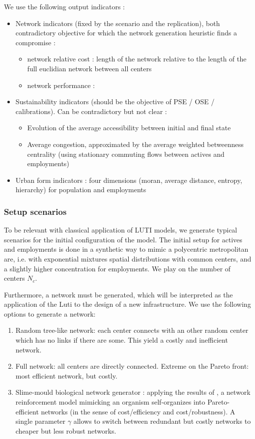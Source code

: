 We use the following output indicators :
\begin{itemize}
	\item Network indicators (fixed by the scenario and the replication), both contradictory objective for which the network generation heuristic finds a compromise :
	\begin{itemize}
		\item network relative cost : length of the network relative to the length of the full euclidian network between all centers
		\item network performance : \cite{banos2012towards}
	\end{itemize}
	\item Sustainability indicators (should be the objective of PSE / OSE / calibrations). Can be contradictory but not clear :
	\begin{itemize}
		\item Evolution of the average accessibility between initial and final state
		\item Average congestion, approximated by the average weighted betweenness centrality (using stationary commuting flows between actives and employments)
	\end{itemize}
	\item Urban form indicators : four dimensions (moran, average distance, entropy, hierarchy) \cite{2017arXiv170806743R} for population and employments
\end{itemize}


\subsubsection{Setup scenarios}

To be relevant with classical application of LUTI models, we generate typical scenarios for the initial configuration of the model. The initial setup for actives and employments is done in a synthetic way to mimic a polycentric metropolitan are, i.e. with exponential mixtures spatial distributions with common centers, and a slightly higher concentration for employments. We play on the number of centers $N_c$.

Furthermore, a network must be generated, which will be interpreted as the application of the Luti to the design of a new infrastructure. We use the following options to generate a network:
\begin{enumerate}
	\item Random tree-like network: each center connects with an other random center which has no links if there are some. This yield a costly and inefficient network.
	\item Full network: all centers are directly connected. Extreme on the Pareto front: most efficient network, but costly.
	\item Slime-mould biological network generator : applying the results of \cite{raimbault2015labex}, a network reinforcement model mimicking an organism self-organizes into Pareto-efficient networks (in the sense of cost/efficiency and cost/robustness). A single parameter $\gamma$ allows to switch between redundant but costly networks to cheaper but less robust networks.
\end{enumerate}

